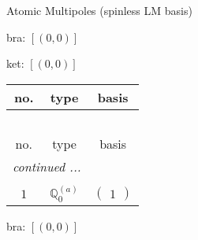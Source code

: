 \documentclass[fleqn,8pt,landscape]{jsarticle}
\begin{document}
\setcounter{MaxMatrixCols}{16}

\begin{center}
\LARGE
Atomic Multipoles (spinless LM basis)
\end{center}
bra: $[(0,0)]$

\noindent
ket: $[(0,0)]$
\begin{center}
\renewcommand{\arraystretch}{1.6}
\begin{longtable}{ccc}
 \hline \hline
no. & type & basis \\ \hline \endfirsthead

\multicolumn{2}{l}{\tablename\ \thetable{}} \\
 \hline \hline
no. & type & basis \\ \hline \endhead

 \hline \hline
\multicolumn{2}{r}{\footnotesize\it continued ...} \\ \endfoot

 \hline \hline
\multicolumn{2}{r}{} \\ \endlastfoot

$ 1 $ & $ \mathbb{Q}_{0}^{(a)} $ & $ \begin{pmatrix} 1 \end{pmatrix} $ \\
\end{longtable}
\end{center}
bra: $[(0,0)]$
\end{document}

